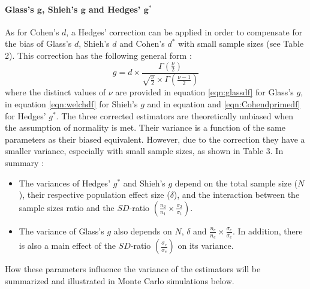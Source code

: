\documentclass[
  english,
  man]{apa6}
\providecommand{\tightlist}{%
  \setlength{\itemsep}{0pt}\setlength{\parskip}{0pt}}
\let\oldparagraph\paragraph
\renewcommand{\paragraph}[1]{\oldparagraph{#1}\mbox{}}
\begin{document}
\hypertarget{glasss-bmg-shiehs-bmg-and-hedges-bmg}{%
\paragraph{\texorpdfstring{Glass's \(\bm{g}\), Shieh's \(\bm{g}\) and Hedges' \(\bm{g^*}\)}{Glass's \textbackslash bm\{g\}, Shieh's \textbackslash bm\{g\} and Hedges' \textbackslash bm\{g\^{}*\}}}\label{glasss-bmg-shiehs-bmg-and-hedges-bmg}}

As for Cohen's \(d\), a Hedges' correction can be applied in order to compensate for the bias of Glass's \(d\), Shieh's \(d\) and Cohen's \(d^*\) with small sample sizes (see Table 2). This correction has the following general form :
\begin{equation*} 
g = d \times \frac{\Gamma(\frac{\nu}{2})}{\sqrt{\frac{\nu}{2}} \times \Gamma(\frac{\nu-1}{2})}
\end{equation*}
where the distinct values of \(\nu\) are provided in equation \ref{eqn:glassdf} for Glass's \(g\), in equation \ref{eqn:welchdf} for Shieh's \(g\) and in equation and \ref{eqn:Cohendprimedf} for Hedges' \(g^*\). The three corrected estimators are theoretically unbiased when the assumption of normality is met. Their variance is a function of the same parameters as their biased equivalent. However, due to the correction they have a smaller variance, especially with small sample sizes, as shown in Table 3. In summary :

\begin{itemize}
\tightlist
\item
  The variances of Hedges' \(g^*\) and Shieh's \(g\) depend on the total sample size (\(N\)), their respective population effect size (\(\delta\)), and the interaction between the sample sizes ratio and the \(SD\)-ratio \(\left(\frac{n_2}{n_1}\times\frac{\sigma_2}{\sigma_1} \right)\).\\
\item
  The variance of Glass's \(g\) also depends on \(N\), \(\delta\) and \(\frac{n_c}{n_e}\times\frac{\sigma_c}{\sigma_e}\). In addition, there is also a main effect of the \(SD\)-ratio \(\left(\frac{\sigma_c}{\sigma_e} \right)\) on its variance.
\end{itemize}

How these parameters influence the variance of the estimators will be summarized and illustrated in Monte Carlo simulations below.

\newpage
\blandscape
\end{document}
